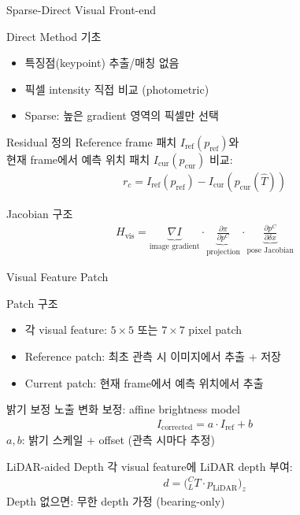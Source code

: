 \begin{frame}{Sparse-Direct Visual Front-end}
  \begin{block}{Direct Method 기초}
    \begin{itemize}
      \item 특징점(keypoint) 추출/매칭 없음
      \item 픽셀 intensity 직접 비교 (photometric)
      \item Sparse: 높은 gradient 영역의 픽셀만 선택
    \end{itemize}
  \end{block}
  \pause
  \begin{block}{Residual 정의}
    Reference frame 패치 $I_{\text{ref}}(p_{\text{ref}})$와\\
    현재 frame에서 예측 위치 패치 $I_{\text{cur}}(p_{\text{cur}})$ 비교:
    \begin{align*}
      r_c = I_{\text{ref}}(p_{\text{ref}}) - I_{\text{cur}}(p_{\text{cur}}(\hat{T}))
    \end{align*}
  \end{block}
  \pause
  \begin{block}{Jacobian 구조}
    \begin{align*}
      H_{\text{vis}} = \underbrace{\nabla I}_{\text{image gradient}}
      \cdot \underbrace{\frac{\partial \pi}{\partial p^C}}_{\text{projection}}
      \cdot \underbrace{\frac{\partial p^C}{\partial \delta x}}_{\text{pose Jacobian}}
    \end{align*}
  \end{block}
\end{frame}

\begin{frame}{Visual Feature Patch}
  \begin{block}{Patch 구조}
    \begin{itemize}
      \item 각 visual feature: $5\times5$ 또는 $7\times7$ pixel patch
      \item Reference patch: 최초 관측 시 이미지에서 추출 + 저장
      \item Current patch: 현재 frame에서 예측 위치에서 추출
    \end{itemize}
  \end{block}
  \pause
  \begin{block}{밝기 보정}
    노출 변화 보정: affine brightness model
    \begin{align*}
      I_{\text{corrected}} = a \cdot I_{\text{ref}} + b
    \end{align*}
    $a, b$: 밝기 스케일 + offset (관측 시마다 추정)
  \end{block}
  \pause
  \begin{block}{LiDAR-aided Depth}
    각 visual feature에 LiDAR depth 부여:
    \begin{align*}
      d = \bigl({}^C_LT \cdot p_{\text{LiDAR}}\bigr)_z
    \end{align*}
    Depth 없으면: 무한 depth 가정 (bearing-only)
  \end{block}
\end{frame}

